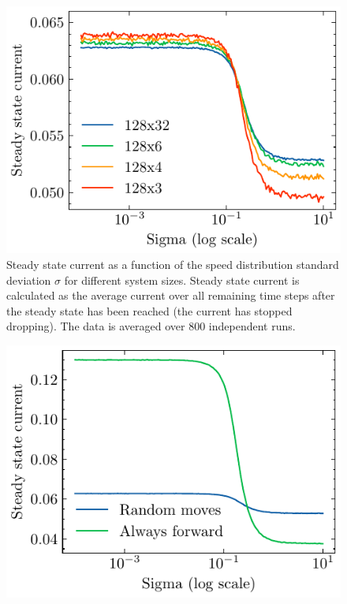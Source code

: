 \begin{figure}
    \centering
    \includegraphics{steady_state_current_sizes_log.pdf}
    \caption{Steady state current as a function of the speed distribution standard deviation $\sigma$ for different system sizes. Steady state current is calculated as the average current over all remaining time steps after the steady state has been reached (the current has stopped dropping). The data is averaged over 800 independent runs.}
    \label{fig:steady_state_current_sizes_log}
\end{figure}

\begin{figure}
    \centering
    \includegraphics{steady_state_current_both_log.pdf}
    \caption{}
    \label{fig:steady_state_current_always_forward}
\end{figure}
